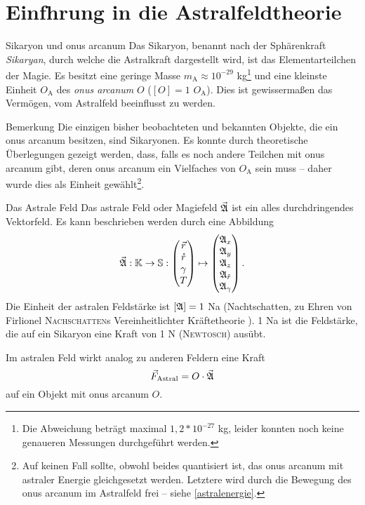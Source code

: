 \section[tocentry=Einführung in die Astralfeldtheorie, head=Einführung in die Astralfeldtheorie]{Einf\uese hrung in die Astralfeldtheorie}
\begin{bla}{Sikaryon und onus arcanum}
Das Sikaryon, benannt nach der Sphärenkraft \emph{Sikaryan}, durch welche die Astralkraft dargestellt wird, ist das Elementarteilchen der Magie. Es besitzt eine geringe Masse $m_\text{A}\approx10^{-29}$ kg\footnote{Die Abweichung beträgt maximal $1,2*10^{-27}$ kg, leider konnten noch keine genaueren Messungen durchgeführt werden.} und eine kleinste Einheit $O_\text{A}$ des \emph{onus arcanum} $O$ ($[O]=1$ $O_\text{A}$). Dies ist gewissermaßen das Vermögen, vom Astralfeld beeinflusst zu werden.
\end{bla}
\begin{bla}{Bemerkung}
Die einzigen bisher beobachteten und bekannten Objekte, die ein onus arcanum besitzen, sind Sikaryonen. Es konnte durch theoretische Überlegungen \cite{quanten} gezeigt werden, dass, falls es noch andere Teilchen mit onus arcanum gibt, deren onus arcanum ein Vielfaches von $O_\text{A}$ sein muss -- daher wurde dies als Einheit gewählt\footnote{Auf keinen Fall sollte, obwohl beides quantisiert ist, das onus arcanum mit astraler Energie gleichgesetzt werden. Letztere wird durch die Bewegung des onus arcanum im Astralfeld frei -- siehe \ref{astralenergie}.}.
\end{bla}
\begin{bla}{Das Astrale Feld}
Das astrale Feld oder Magiefeld $\vec{\mathfrak{A}}$ ist ein alles durchdringendes Vektorfeld. Es kann beschrieben werden durch eine Abbildung
\begin{equation}
\vec{\mathfrak{A}}: \mathbb{K}\to\mathbb{S}: \begin{pmatrix}\vec{r}\\\mathring{r}\\\gamma\\T\end{pmatrix}\mapsto\begin{pmatrix}\mathfrak{A}_x\\\mathfrak{A}_y\\\mathfrak{A}_z\\\mathfrak{A}_{\mathring{r}}\\\mathfrak{A}_\gamma\end{pmatrix}\text{.}
\end{equation}
Die Einheit der astralen Feldstärke ist $[\mathfrak{A}]=1$ Na (Nachtschatten, zu Ehren von Firlionel \textsc{Nachschatten}s Vereinheitlichter Kräftetheorie \cite{nachtschatten}). 1 Na ist die Feldstärke, die auf ein Sikaryon eine Kraft von 1 N (\textsc{Newtosch}) ausübt.

Im astralen Feld wirkt analog zu anderen Feldern eine Kraft
\begin{equation}
\vec{F}_\text{Astral}=O\cdot\vec{\mathfrak{A}}\label{eq:astralkraft}
\end{equation}
auf ein Objekt mit onus arcanum $O$.
\end{bla}

